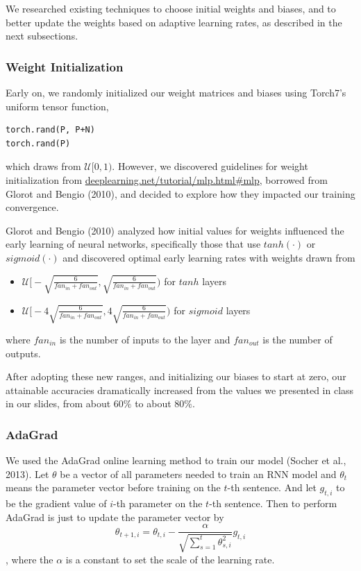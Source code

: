 \documentclass[11pt]{article}
\begin{document}
We researched existing techniques to choose initial weights and biases, and to better update the weights based on adaptive learning rates, as described in the next subsections.

\subsubsection{Weight Initialization}\label{Weights}

Early on, we randomly initialized our weight matrices and biases using Torch7's uniform tensor function,
\begin{lstlisting}
torch.rand(P, P+N)
torch.rand(P)
\end{lstlisting}
which draws from $\mathcal{U}[0, 1)$. However, we discovered guidelines for weight initialization from \hyperlink{http://deeplearning.net/tutorial/mlp.html\#mlp}{deeplearning.net/tutorial/mlp.html\#mlp}, borrowed from Glorot and Bengio (2010), and decided to explore how they impacted our training convergence.

Glorot and Bengio (2010) analyzed how initial values for weights influenced the early learning of neural networks, specifically those that use $tanh(\cdot)$ or $sigmoid(\cdot)$ and discovered optimal early learning rates with weights drawn from
\begin{itemize}
\item $\mathcal{U}\Big[-\sqrt{\frac{6}{fan_{in}+fan_{out}}},\sqrt{\frac{6}{fan_{in}+fan_{out}}}\Big)$ for $tanh$ layers
\item $\mathcal{U}\Big[-4\sqrt{\frac{6}{fan_{in}+fan_{out}}},4\sqrt{\frac{6}{fan_{in}+fan_{out}}}\Big)$ for $sigmoid$ layers
\end{itemize}
where $fan_{in}$ is the number of inputs to the layer and $fan_{out}$ is the number of outputs.

After adopting these new ranges, and initializing our biases to start at zero, our attainable accuracies dramatically increased from the values we presented in class in our slides, from about $60\%$ to about $80\%$.

\subsubsection{AdaGrad}
We used the AdaGrad online learning method to train our model (Socher et al., 2013). Let $\theta$ be a vector of all parameters needed to train an RNN model and $\theta_t$ means the parameter vector before training on the $t$-th sentence. And let $g_{t,i}$ to be the gradient value of $i$-th parameter on the $t$-th sentence. Then to perform AdaGrad is just to update the parameter vector by
$$\theta_{{t+1},i} = \theta_{{t},i}  - \frac{\alpha}{\sqrt{\sum_{s=1}^t \theta_{{s},i}^2 }} g_{t,i}$$,
where the $\alpha$ is a constant to set the scale of the learning rate.
\end{document}
